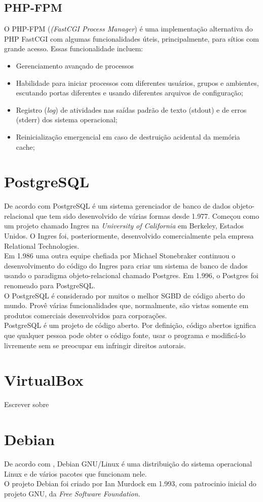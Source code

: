 \subsection{PHP-FPM}
O PHP-FPM (\textit{(FastCGI Process Manager}) é uma implementação alternativa do PHP FastCGI com algumas funcionalidades úteis, principalmente, para sítios com grande acesso. Essas funcionalidade incluem:
\begin{itemize}
	\item Gerenciamento avançado de processos
	\item Habilidade para iniciar processos com diferentes usuários, grupos e ambientes, escutando portas diferentes e usando diferentes arquivos de configuração;
	\item Registro (\textit{log}) de atividades nas saídas padrão de texto (stdout) e de erros (stderr) dos sistema operacional;
	\item Reinicialização emergencial em caso de destruição acidental da memória cache;
\end{itemize}
\section{PostgreSQL}
De acordo com  PostgreSQL é um sistema gerenciador de banco de dados objeto-relacional que tem sido desenvolvido de várias formas desde 1.977. Começou como um projeto chamado Ingres na \textit{University of California} em Berkeley, Estados Unidos. O Ingres foi, posteriormente, desenvolvido comercialmente pela empresa Relational Technologies.\\
Em 1.986 uma outra equipe chefiada por Michael Stonebraker continuou o desenvolvimento do código do Ingres para criar um sistema de banco de dados usando o paradigma objeto-relacional chamado Postgres. Em 1.996, o Postgres foi renomeado para PostgreSQL.\\
O PostgreSQL é considerado por muitos o melhor SGBD de código aberto do mundo. Provê várias funcionalidades que, normalmente, são vistas somente em produtos comerciais desenvolvidos para corporações.\\
PostgreSQL é um projeto de código aberto. Por definição, código abertos ignifica que qualquer pessoa pode obter o código fonte, usar o programa e modificá-lo livremente sem se preocupar em infringir direitos autorais.
\section{VirtualBox}
Escrever sobre
\section{Debian}
De acordo com , Debian GNU/Linux é uma distribuição do sistema operacional Linux e de vários pacotes que funcionam nele.\\
O projeto Debian foi criado por Ian Murdock em 1.993, com patrocinio inicial do projeto GNU, da \textit{Free Software Foundation}.